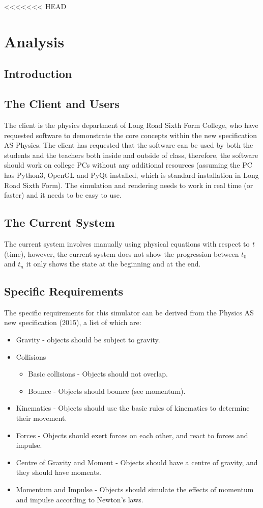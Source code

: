 <<<<<<< HEAD
\chapter{Analysis}

\section{Introduction}

\section{The Client and Users}
The client is the physics department of Long Road Sixth Form College, who have requested software to demonstrate the core concepts within the new specification AS Physics. The client has requested that the software can be used by both the students and the teachers both inside and outside of class, therefore, the software should work on college PCs without any additional resources (assuming the PC has Python3, OpenGL and PyQt installed, which is standard installation in Long Road Sixth Form). The simulation and rendering needs to work in real time (or faster) and it needs to be easy to use.

\section{The Current System}
The current system involves manually using physical equations with respect to \textit{t} (time), however, the current system does not show the progression between $t_0$ and $t_n$ it only shows the state at the beginning and at the end.

\section{Specific Requirements}
The specific requirements for this simulator can be derived from the Physics AS new specification (2015), a list of which are:
\begin{itemize}
	\item Gravity  - objects should be subject to gravity.
	\item Collisions
	\begin{itemize}
		\item Basic collisions - Objects should not overlap.
		\item Bounce - Objects should bounce (see momentum).
	\end{itemize}
	\item Kinematics - Objects should use the basic rules of kinematics to determine their movement.
	\item Forces - Objects should exert forces on each other, and react to forces and impulse.
	\item Centre of Gravity and Moment - Objects should have a centre of gravity, and they should have moments.
	\item Momentum and Impulse - Objects should simulate the effects of momentum and impulse according to Newton's laws.
\end{itemize}

